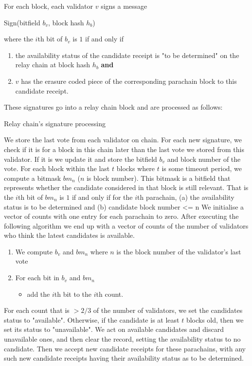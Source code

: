For each block, each validator $v$ signs a message

Sign(bitfield $b_v$, block hash $h_b$)

where the $i$th bit of $b_v$ is $1$ if and only if 

\begin{enumerate}
\item the availability status of the candidate receipt is "to be determined" on the relay chain at block hash $h_b$ \textbf{and}

\item $v$ has the erasure coded piece of the corresponding parachain block to this candidate receipt.
\end{enumerate}

These signatures go into a relay chain block and are processed as follows:

\begin{algorithm}
  \caption[]{Relay chain's signature processing}
  \label{algo-singnature-processing} 
  \begin{algorithmic}[1]
\State We store the last vote from each validator on chain. For each new signature, we check if it is for a block in this chain later than the last vote we stored from this validator. If it is we update it and store the bitfield $b_v$ and block number of the vote.
\State For each block within the last $t$ blocks where $t$ is some timeout period, we compute a bitmask $bm_n$ ($n$ is block number). This bitmask is a bitfield that represents whether the candidate considered in that block is still relevant. That is the $i$th bit of $bm_n$ is $1$ if and only if for the $i$th parachain, 
    (a) the availability status is to be determined and
    (b) candidate block number <= n   
\State We initialise a vector of counts with one entry for each parachain to zero. After executing the following algorithm we end up with a vector of counts  of the number of validators who think the latest candidates is available. 
	\begin{enumerate}
    \item We compute 
    $b_v$ and $bm_n$ 
    where $n$ is the block number of the validator's last vote
   \item For each bit in $b_v$ and $bm_n$
		\begin{itemize}
        \item add the $i$th bit to the $i$th count.
        \end{itemize}
	\end{enumerate}	
\State For each count that is $>2/3$ of the number of validators, we set the candidates status to "available". Otherwise, if the candidate is at least $t$ blocks old, then we set its status to "unavailable".
\State We act on available candidates and discard unavailable ones, and then clear the record, setting the availability status to no candidate. Then we accept new candidate receipts for these parachains, with any such new candidate receipts having their availability status as to be determined.
\end{algorithmic}
\end{algorithm}

